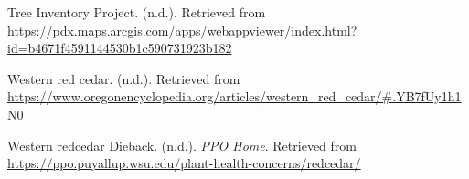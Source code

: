 \documentclass[12pt,twoside]{reedthesis}
\begin{document}
\leavevmode\hypertarget{ref-noauthor_tree_nodate}{}%
Tree Inventory Project. (n.d.). Retrieved from \url{https://pdx.maps.arcgis.com/apps/webappviewer/index.html?id=b4671f4591144530b1c590731923b182}

\leavevmode\hypertarget{ref-noauthor_western_nodate-1}{}%
Western red cedar. (n.d.). Retrieved from \url{https://www.oregonencyclopedia.org/articles/western_red_cedar/\#.YB7fUy1h1N0}

\leavevmode\hypertarget{ref-noauthor_western_nodate}{}%
Western redcedar Dieback. (n.d.). \emph{PPO Home}. Retrieved from \url{https://ppo.puyallup.wsu.edu/plant-health-concerns/redcedar/}


\end{document}

